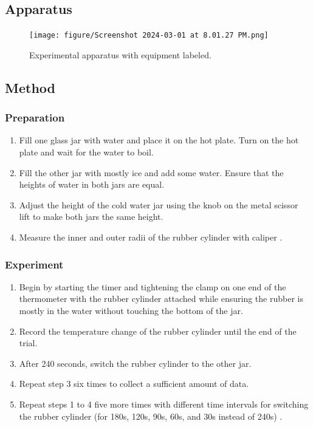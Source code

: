 \documentclass[12pt]{article}
\begin{document}
\subsection{Apparatus}
\begin{figure}[h!]
    \centering
    \texttt{[image: figure/Screenshot 2024-03-01 at 8.01.27 PM.png]}
    \caption{Experimental apparatus with equipment labeled.}
    \label{fig:0}
\end{figure}

\subsection{Method} 
\subsubsection{Preparation}
\begin{enumerate}
    \item Fill one glass jar with water and place it on the hot plate. Turn on the hot plate and wait for the water to boil.
    \item Fill the other jar with mostly ice and add some water. Ensure that the heights of water in both jars are equal.
    \item Adjust the height of the cold water jar using the knob on the metal scissor lift to make both jars the same height.
    \item Measure the inner and outer radii of the rubber cylinder with caliper \autocite{manuall}.
\end{enumerate}
\subsubsection{Experiment}
\begin{enumerate}
    \item Begin by starting the timer and tightening the clamp on one end of the thermometer with the rubber cylinder attached while ensuring the rubber is mostly in the water without touching the bottom of the jar.
    \item Record the temperature change of the rubber cylinder until the end of the trial.
    \item After 240 seconds, switch the rubber cylinder to the other jar.
    \item Repeat step 3 six times to collect a sufficient amount of data.
    \item Repeat steps 1 to 4 five more times with different time intervals for switching the rubber cylinder (for 180s, 120s, 90s, 60s, and 30s instead of 240s) \autocite{manuall}. 
\end{enumerate}
\end{document}
